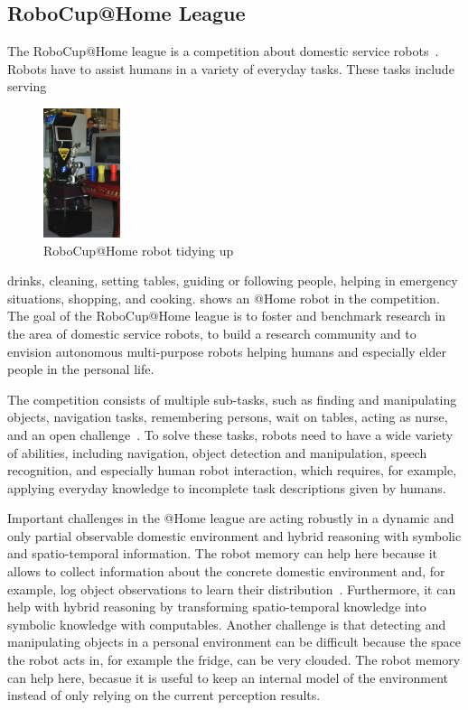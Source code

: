 \subsection{RoboCup@Home League}
The RoboCup@Home league is a competition about domestic service
robots~\cite{wisspeintner2009robocup}. Robots have to assist
humans in a variety of everyday tasks. These tasks include
serving
\begin{figure}
  \centering
  \includegraphics[width=0.2\textwidth]{img/ceasar}%
  \caption[RoboCup@Home robot tidying up]{RoboCup@Home robot tidying up~\cite{wisspeintner2009robocup}}
  \vspace{-3mm}
  \label{fig:athome}
\end{figure}
drinks, cleaning, setting tables, guiding or following people,
helping in emergency situations, shopping, and cooking.
 shows an @Home robot in the
competition.
%
The goal of the RoboCup@Home league is to foster and benchmark
research in the area of domestic service robots, to build a research
community and to envision autonomous multi-purpose robots helping
humans and especially elder people in the personal life.

The competition consists of multiple sub-tasks,
such as finding and manipulating objects, navigation tasks,
remembering persons, wait on tables, acting as
nurse, and an open challenge~\cite{athome-rules}.
To solve these tasks, robots need to
have a wide variety of abilities, including navigation, object
detection and manipulation, speech recognition, and especially human
robot interaction, which requires, for example, applying everyday
knowledge to incomplete task descriptions given by humans.

Important challenges in the @Home league are acting robustly in a
dynamic and only partial observable domestic environment and hybrid
reasoning with symbolic and spatio-temporal information.  The robot
memory can help here because it allows to collect information about
the concrete domestic environment and, for example, log object
observations to learn their distribution~\cite{deebul}.  Furthermore,
it can help with hybrid reasoning by transforming spatio-temporal
knowledge into symbolic knowledge with computables.  Another challenge
is that detecting and manipulating objects in a personal environment
can be difficult because the space the robot acts in, for example the
fridge, can be very clouded. The robot memory can help here, becasue
it is useful to keep an internal model of the environment instead of
only relying on the current perception
results.  

